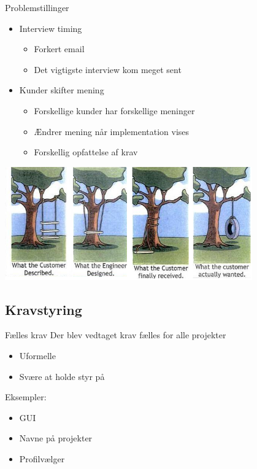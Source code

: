 \begin{frame}{Problemstillinger}
\begin{itemize}
\item Interview timing
\begin{itemize}
\item Forkert email
\item Det vigtigste interview kom meget sent
\end{itemize}
\item Kunder skifter mening
\begin{itemize}
\item Forskellige kunder har forskellige meninger
\item Ændrer mening når implementation vises
\item Forskellig opfattelse af krav
\end{itemize}
\end{itemize}
\begin{center}
\includegraphics[width=0.8\textwidth]{pgraphics/whatthecostumerwanted}
\end{center}
\end{frame}

\subsection{Kravstyring}


\begin{frame}{Fælles krav}
Der blev vedtaget krav fælles for alle projekter
\begin{itemize}
\item Uformelle 
\item Svære at holde styr på
\end{itemize}

Eksempler:
\begin{itemize}
\item GUI
\item Navne på projekter
\item Profilvælger
\end{itemize}
\end{frame}

